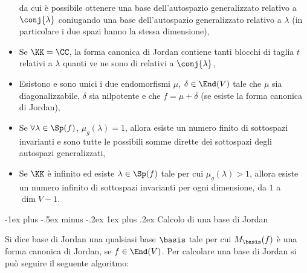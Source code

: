 \documentclass[10pt,landscape]{article}
\makeatletter
\renewcommand{\subsubsection}{\@startsection{subsubsection}{3}{0mm}%
	{-1ex plus -.5ex minus -.2ex}%
	{1ex plus .2ex}%
	{\normalfont\small\bfseries}}
\makeatother
\begin{document}
\begin{multicols}{3}
\begin{itemize}
			da cui è possibile ottenere una base dell'autospazio generalizzato relativo
			a $\conj{\lambda}$ coniugando una base dell'autospazio generalizzato relativo
			a $\lambda$ (in particolare i due spazi hanno la stessa dimensione),
			\item Se $\KK=\CC$, la forma canonica di Jordan contiene tanti blocchi di taglia $t$
			relativi a $\lambda$ quanti ve ne sono di relativi a $\conj{\lambda}$,
			\item Esistono e sono unici i due endomorfismi $\mu$, $\delta \in \End(V)$
			tale che $\mu$ sia diagonalizzabile, $\delta$ sia nilpotente e che
			$f = \mu + \delta$ (se esiste la forma canonica di Jordan),
			\item Se $\forall \lambda \in \Sp(f)$, $\mu_g(\lambda) = 1$, allora
			esiste un numero finito di sottospazi invarianti e sono tutte le possibili
			somme dirette dei sottospazi degli autospazi generalizzati, %
			\item Se $\KK$ è infinito ed esiste $\lambda \in \Sp(f)$ tale per cui
			$\mu_g(\lambda) > 1$, allora esiste un numero infinito di sottospazi invarianti
			per ogni dimensione, da $1$ a $\dim V -1$. %
		\end{itemize}
		
		\subsubsection{Calcolo di una base di Jordan}
		
		Si dice base di Jordan una qualsiasi base $\basis$ tale per cui
		$M_\basis(f)$ è una forma canonica di Jordan, se $f \in \End(V)$.
		Per calcolare una base di Jordan si può seguire il seguente
		algoritmo:
		

\end{multicols}
\end{document}
